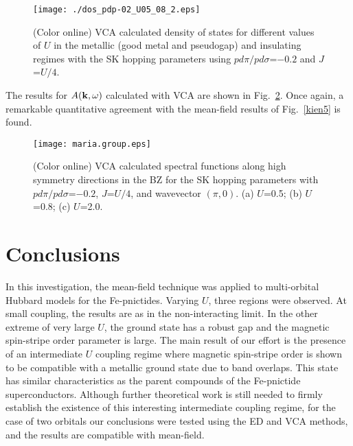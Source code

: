 \documentclass[aps,prb,superscriptaddress,preprintnumbers,
showpacs,legalpaper,twoside,twocolumn,amsmath,amssymb]{revtex4}
\begin{document}
\begin{figure}[thbp]
\begin{center}
\texttt{[image: ./dos\_pdp-02\_U05\_08\_2.eps]}
\vskip -0.3cm
\caption{(Color online)  VCA calculated density of states for different values of $U$ in the
metallic (good metal and pseudogap) and insulating regimes with the SK hopping parameters using
$pd\pi/pd\sigma$=$-0.2$ and $J$=$U/4$.
}
\vskip -0.3cm
\label{dos}
\end{center}
\end{figure}


The results for $A({\bf k},\omega)$ calculated with VCA are shown in
Fig.~\ref{vca}. Once again, a remarkable quantitative agreement with
the mean-field results of Fig.~\ref{kien5} is found.






\begin{figure}[thbp]
\begin{center}
\texttt{[image: maria.group.eps]}
\vskip -0.3cm
\caption{(Color online)  VCA calculated spectral functions along high symmetry directions in
the BZ for the SK hopping parameters with
$pd\pi/pd\sigma$=$-0.2$, $J$=$U/4$, and wavevector $(\pi,0)$.
(a) $U$=0.5;
(b) $U$=0.8; (c) $U$=2.0.
}
\vskip -0.9cm
\label{vca}
\end{center}
\end{figure}



\section{Conclusions}

In this investigation, the mean-field technique was applied to multi-orbital
Hubbard models for the Fe-pnictides. Varying $U$, three regions were observed. At
small coupling, the results are as in the non-interacting limit. In the other extreme of
very large $U$, the ground state has a robust gap and the magnetic spin-stripe
order parameter is large. The main result of our effort is the presence
of an intermediate $U$ coupling regime where magnetic spin-stripe order is shown to be
compatible with a metallic ground state due to band overlaps. This state has
similar characteristics as the parent compounds of the Fe-pnictide
superconductors.
Although further theoretical work is still needed to
firmly establish the existence of this interesting intermediate coupling regime,
for the case of two orbitals our conclusions were tested using
the ED and VCA methods, and the results are compatible with
mean-field.
\end{document}
